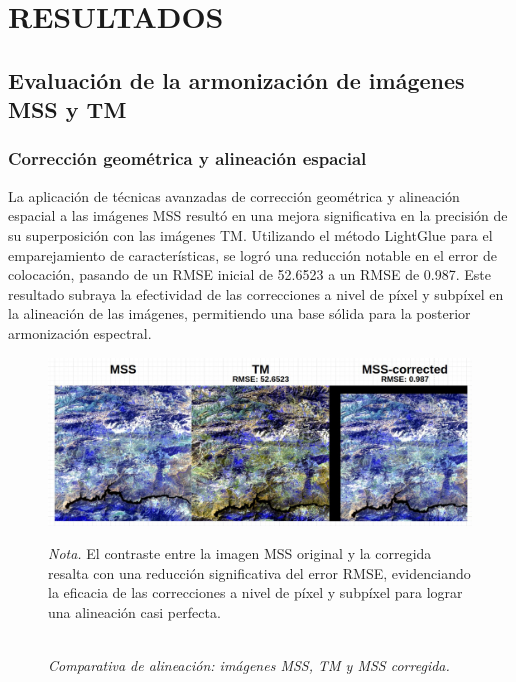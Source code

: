 \Chapter{}

\chapter{RESULTADOS}

    \section{Evaluación de la armonización de imágenes MSS y TM}
        \subsection{Corrección geométrica y alineación espacial}
            La aplicación de técnicas avanzadas de corrección geométrica y alineación espacial a las imágenes MSS resultó en una mejora significativa en la precisión de su superposición con las imágenes TM. Utilizando el método LightGlue para el emparejamiento de características, se logró una reducción notable en el error de colocación, pasando de un RMSE inicial de 52.6523 a un RMSE de 0.987. Este resultado subraya la efectividad de las correcciones a nivel de píxel y subpíxel en la alineación de las imágenes, permitiendo una base sólida para la posterior armonización espectral.

            \begin{figure}[H] 
                \caption{\doublespacing \\ \textit{Comparativa de alineación: imágenes MSS, TM y MSS corregida.}} 
                \centering
                \includegraphics[width=1\linewidth]{2_CAPITULO0/IMG/tm_mss_rmse.png}
                \begin{justify}
                    \textit{Nota.} El contraste entre la imagen MSS original y la corregida resalta con una reducción significativa del error RMSE, evidenciando la eficacia de las correcciones a nivel de píxel y subpíxel para lograr una alineación casi perfecta.
                \end{justify}                    
                \label{tm_mss_rmse}
            \end{figure}

